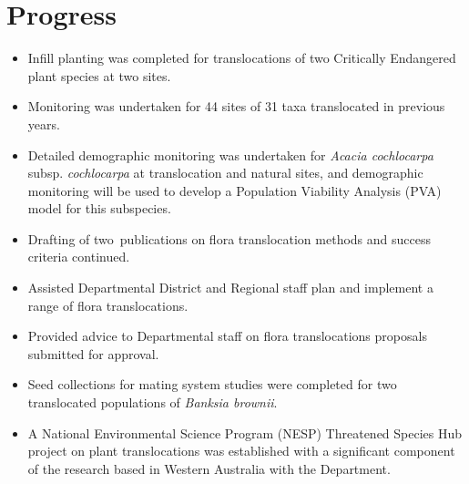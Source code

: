 \documentclass[version=last,
    paper=a4, %
    10pt, %
    usenames,
    dvipsnames,
    oneside, %
    headings=openany, %
    DIV=15 %
]{scrbook}
\begin{document}
\section*{Progress}
\begin{itemize}
\itemsep1pt\parskip0pt
\item
  Infill planting was completed for translocations of two Critically
  Endangered plant species at two sites.
\item
  Monitoring was undertaken for 44 sites of 31 taxa translocated in
  previous years.
\item
  Detailed demographic monitoring was undertaken for \emph{Acacia
  cochlocarpa} subsp. \emph{cochlocarpa} at translocation and natural
  sites, and demographic monitoring will be used to develop a Population
  Viability Analysis (PVA) model for this subspecies.
\item
  Drafting of two~publications on flora translocation methods and
  success criteria continued.
\item
  Assisted Departmental District and Regional staff plan and implement a
  range of flora translocations.
\item
  Provided advice to Departmental staff on flora translocations
  proposals submitted for approval.
\item
  Seed collections for mating system studies were completed for two
  translocated populations of \emph{Banksia brownii}.
\item
  A National Environmental Science Program (NESP) Threatened Species Hub
  project on plant translocations was established with a significant
  component of the research based in Western Australia with the
  Department.~
\end{itemize}
\end{document}
